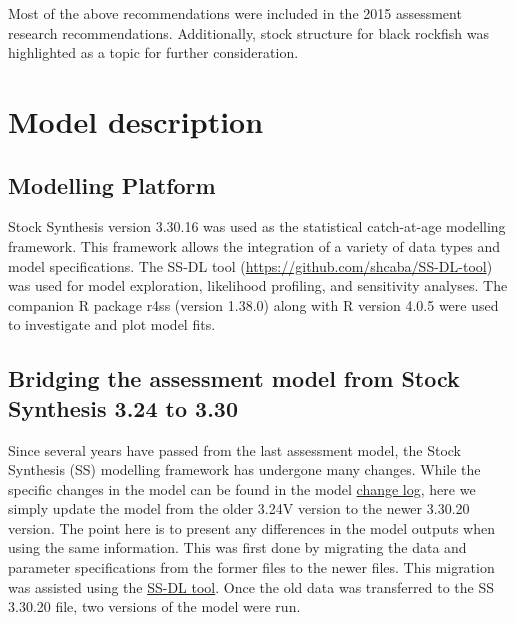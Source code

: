 \documentclass[11pt,
  english,
  letterpaper,
]{article}
\begin{document}
Most of the above recommendations were included in the 2015 assessment research recommendations. Additionally, stock structure for black rockfish was highlighted as a topic for further consideration.

\hypertarget{model-description}{%
\section{Model description}\label{model-description}}

\hypertarget{modelling-platform}{%
\subsection{Modelling Platform}\label{modelling-platform}}

Stock Synthesis version 3.30.16 was used as the statistical catch-at-age modelling framework. This framework allows the integration of a variety of data types and model specifications. The SS-DL tool (\url{https://github.com/shcaba/SS-DL-tool}) was used for model exploration, likelihood profiling, and sensitivity analyses. The companion R package r4ss (version 1.38.0) along with R version 4.0.5 were used to investigate and plot model fits.

\hypertarget{bridging-the-assessment-model-from-stock-synthesis-3.24-to-3.30}{%
\subsection{Bridging the assessment model from Stock Synthesis 3.24 to 3.30}\label{bridging-the-assessment-model-from-stock-synthesis-3.24-to-3.30}}

Since several years have passed from the last assessment model, the Stock Synthesis (SS) modelling framework has undergone many changes. While the specific changes in the model can be found in the model \href{https://github.com/nmfs-stock-synthesis/stock-synthesis/blob/v3.30.19/Change_log_for_SS_3.30.xlsx?raw=true}{change log}, here we simply update the model from the older 3.24V version to the newer 3.30.20 version. The point here is to present any differences in the model outputs when using the same information. This was first done by migrating the data and parameter specifications from the former files to the newer files. This migration was assisted using the \href{https://github.com/shcaba/SS-DL-tool}{SS-DL tool}. Once the old data was transferred to the SS 3.30.20 file, two versions of the model were run.
\end{document}
